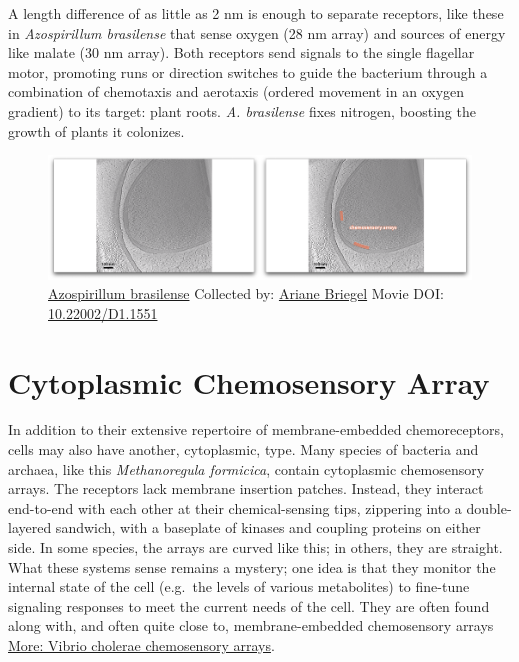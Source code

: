 \documentclass[]{tufte-book}
\begin{document}
A length difference of as little as 2 nm is enough to separate
receptors, like these in \emph{Azospirillum brasilense} that sense
oxygen (28 nm array) and sources of energy like malate (30 nm array).
Both receptors send signals to the single flagellar motor, promoting
runs or direction switches to guide the bacterium through a combination
of chemotaxis and aerotaxis (ordered movement in an oxygen gradient) to
its target: plant roots. \emph{A. brasilense} fixes nitrogen, boosting
the growth of plants it colonizes.





\begin{figure}
\includegraphics{movie_stills/7_4a} \caption[\protect\hyperlink{tree}{Azospirillum brasilense} Collected
by: \protect\hyperlink{ariane_briegel}{Ariane Briegel} Movie DOI:
\href{https://doi.org/10.22002/D1.1551}{10.22002/D1.1551}]{\protect\hyperlink{tree}{Azospirillum brasilense} Collected
by: \protect\hyperlink{ariane_briegel}{Ariane Briegel} Movie DOI:
\href{https://doi.org/10.22002/D1.1551}{10.22002/D1.1551}}\label{fig:7-4a}
\end{figure}

\section{Cytoplasmic Chemosensory
Array}\label{cytoplasmic-chemosensory-array}

In addition to their extensive repertoire of membrane-embedded
chemoreceptors, cells may also have another, cytoplasmic, type. Many
species of bacteria and archaea, like this \emph{Methanoregula
formicica}, contain cytoplasmic chemosensory arrays. The receptors lack
membrane insertion patches. Instead, they interact end-to-end with each
other at their chemical-sensing tips, zippering into a double-layered
sandwich, with a baseplate of kinases and coupling proteins on either
side. In some species, the arrays are curved like this; in others, they
are straight. What these systems sense remains a mystery; one idea is
that they monitor the internal state of the cell (e.g.~the levels of
various metabolites) to fine-tune signaling responses to meet the
current needs of the cell. They are often found along with, and often
quite close to, membrane-embedded chemosensory arrays
\protect\hyperlink{Vibrio_cholerae_chemosensory_arrays}{More: Vibrio
cholerae chemosensory arrays}.
\end{document}
